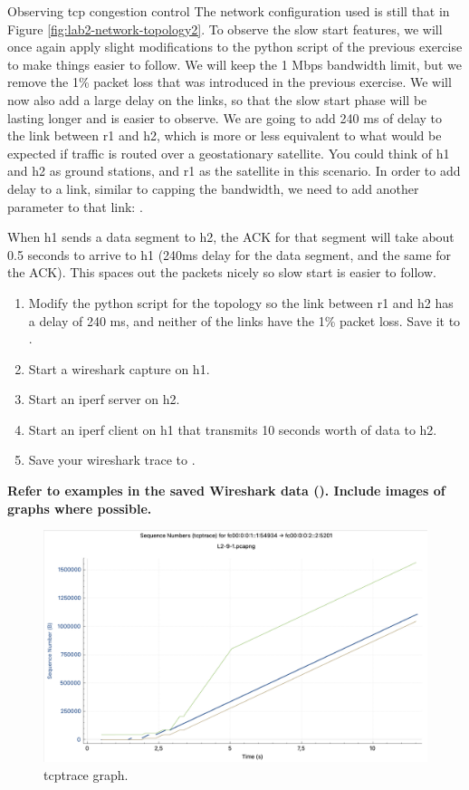 \begin{exercise}{Observing \ac{tcp} congestion control}
The network configuration used is still that in Figure \ref{fig:lab2-network-topology2}. To observe the slow start features, we will once again apply slight modifications to the python script of the previous exercise to make things easier to follow. We will keep the 1 Mbps bandwidth limit, but we remove the 1\% packet loss that was introduced in the previous exercise. We will now also add a large delay on the links, so that the slow start phase will be lasting longer and is easier to observe. We are going to add 240 ms of delay to the link between r1 and h2, which is more or less equivalent to what would be expected if traffic is routed over a geostationary satellite. You could think of h1 and h2 as ground stations, and r1 as the satellite in this scenario. In order to add delay to a link, similar to capping the bandwidth, we need to add another parameter to that link: .

When h1 sends a data segment to h2, the ACK for that segment will take about 0.5 seconds to arrive to h1 (240ms delay for the data segment, and the same for the ACK). This spaces out the packets nicely so slow start is easier to follow.


\begin{enumerate}
	\item Modify the python script for the topology so the link between r1 and h2 has a delay of 240 ms, and neither of the links have the 1\% packet loss. Save it to .
	\item Start a wireshark capture on h1.
	\item Start an iperf server on h2.
	\item Start an iperf client on h1 that transmits 10 seconds worth of data to h2.
	\item Save your wireshark trace to .
\end{enumerate}

\textbf{Refer to examples in the saved Wireshark data (). Include images of graphs where possible.}

\begin{figure}[ht]
	\centering
	\includegraphics[width=\linewidth]{graphics/Lab2-tcptrace}	
	\caption{tcptrace graph.}	
	\label{fig:lab2-tcptrace}
\end{figure}


\end{exercise}
